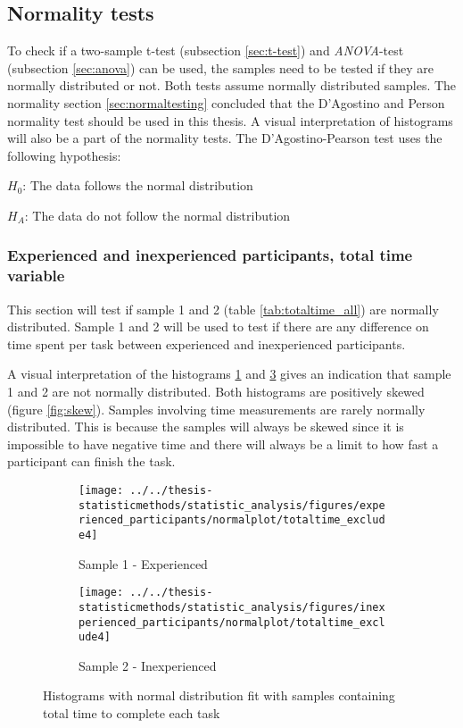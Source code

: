 \subsection{Normality tests}\label{sec:normality_results}
To check if a two-sample t-test (subsection \ref{sec:t-test}) and \textit{ANOVA}-test (subsection \ref{sec:anova}) can be used, the samples need to be tested if they are normally distributed or not. Both tests assume normally distributed samples. The normality section \ref{sec:normaltesting} concluded that the D'Agostino and Person normality test should be used in this thesis. A visual interpretation of histograms will also be a part of the normality tests. The D'Agostino-Pearson test uses the following hypothesis:\newline

\centerline{$H_{0}$: The data follows the normal distribution} 
\centerline{$H_{A}$: The data do not follow the normal distribution}


\subsubsection[Sample 1 and 2]{Experienced and inexperienced participants, total time variable}\label{sec:sample1,2_normresult}
This section will test if sample 1 and 2 (table \ref{tab:totaltime_all}) are normally distributed. Sample 1 and 2 will be used to test if there are any difference on time spent per task between experienced and inexperienced participants. 

A visual interpretation of the histograms \ref{fig:totaltimeexclude4_experienced} and \ref{fig:totaltimeexclude4_inexperienced} gives an indication that sample 1 and 2 are not normally distributed. Both histograms are positively skewed (figure \ref{fig:skew}). Samples involving time measurements are rarely normally distributed. This is because the samples will always be skewed since it is impossible to have negative time and there will always be a limit to how fast a participant can finish the task. 

\begin{figure}[H]
	\centering
	\begin{subfigure}[b]{0.48\textwidth}
		\centering
		\texttt{[image: ../../thesis-statisticmethods/statistic\_analysis/figures/experienced\_participants/normalplot/totaltime\_exclude4]}
		\caption{Sample 1 - Experienced}
		\label{fig:totaltimeexclude4_experienced}
	\end{subfigure}
	\begin{subfigure}[b]{0.48\textwidth}
		\centering
		\texttt{[image: ../../thesis-statisticmethods/statistic\_analysis/figures/inexperienced\_participants/normalplot/totaltime\_exclude4]}
		\caption{Sample 2 - Inexperienced}
		\label{fig:totaltimeexclude4_inexperienced}
	\end{subfigure}
\caption{Histograms with normal distribution fit with samples containing total time to complete each task}
\end{figure}

